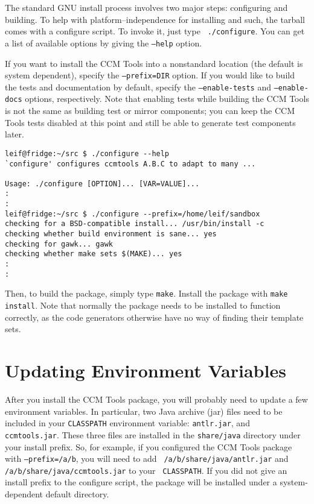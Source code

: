 The standard GNU install process involves two major steps: configuring and
building. To help with platform--independence for installing and such, the
tarball comes with a configure script. To invoke it, just type {\tt
./configure}. You can get a list of available options by giving the {\tt --help}
option.

If you want to install the CCM Tools into a nonstandard location (the default is
system dependent), specify the {\tt --prefix=DIR} option. If you would like to
build the tests and documentation by default, specify the {\tt --enable-tests}
and {\tt --enable-docs} options, respectively. Note that enabling tests while
building the CCM Tools is not the same as building test or mirror components;
you can keep the CCM Tools tests disabled at this point and still be able to
generate test components later.

\begin{verbatim}
leif@fridge:~/src $ ./configure --help
`configure' configures ccmtools A.B.C to adapt to many ...

Usage: ./configure [OPTION]... [VAR=VALUE]...
:
:
leif@fridge:~/src $ ./configure --prefix=/home/leif/sandbox
checking for a BSD-compatible install... /usr/bin/install -c
checking whether build environment is sane... yes
checking for gawk... gawk
checking whether make sets $(MAKE)... yes
:
:
\end{verbatim}

Then, to build the package, simply type {\tt make}. Install the package with
{\tt make install}. Note that normally the package needs to be installed to
function correctly, as the code generators otherwise have no way of finding
their template sets.

\section{Updating Environment Variables}

After you install the CCM Tools package, you will probably need to update a few
environment variables. In particular, two Java archive (jar) files need to be
included in your {\tt CLASSPATH} environment variable: {\tt antlr.jar}, and {\tt
ccmtools.jar}. These three files are installed in the {\tt share/java} directory
under your install prefix. So, for example, if you configured the CCM Tools
package with {\tt --prefix=/a/b}, you will need to add {\tt
/a/b/share/java/antlr.jar} and {\tt /a/b/share/java/ccmtools.jar} to your {\tt
CLASSPATH}. If you did not give an install prefix to the configure script, the
package will be installed under a system-dependent default directory.
